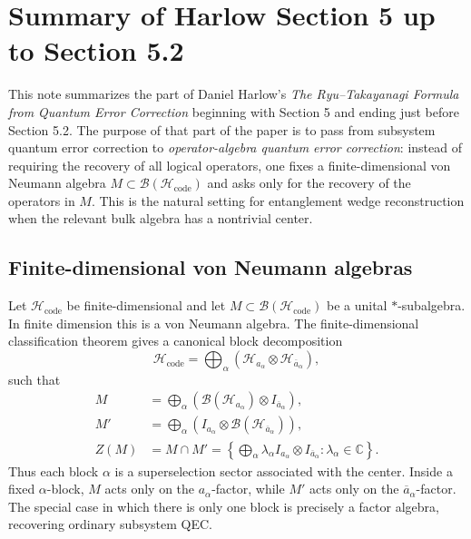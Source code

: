 \documentclass[11pt]{article}
\newcommand{\mH}{\mathcal{H}}
\newcommand{\mB}{\mathcal{B}}
\newcommand{\bara}{\overline{a}}
\newcommand{\code}{\mathrm{code}}
\begin{document}
\section*{Summary of Harlow Section 5 up to Section 5.2}

This note summarizes the part of Daniel Harlow's
\emph{The Ryu--Takayanagi Formula from Quantum Error Correction}
\cite{HarlowRTQEC} beginning with Section 5 and ending just before Section 5.2.
The purpose of that part of the paper is to pass from subsystem quantum error
correction to \emph{operator-algebra quantum error correction}: instead of
requiring the recovery of all logical operators, one fixes a finite-dimensional
von Neumann algebra \(M\subset \mB(\mH_{\code})\) and asks only for the recovery
of the operators in \(M\).  This is the natural setting for entanglement wedge
reconstruction when the relevant bulk algebra has a nontrivial center.

\subsection*{Finite-dimensional von Neumann algebras}

Let \(\mH_{\code}\) be finite-dimensional and let \(M\subset \mB(\mH_{\code})\)
be a unital \(*\)-subalgebra.  In finite dimension this is a von Neumann
algebra.  The finite-dimensional classification theorem gives a canonical block
decomposition
\begin{equation}
    \mH_{\code}
    =
    \bigoplus_{\alpha}
    \left(\mH_{a_\alpha}\otimes \mH_{\bara_\alpha}\right),
    \label{eq:code-block-decomp}
\end{equation}
such that
\begin{align}
    M
    &=
    \bigoplus_{\alpha}
    \left(\mB(\mH_{a_\alpha})\otimes I_{\bara_\alpha}\right),
    \label{eq:M-block-form}\\
    M'
    &=
    \bigoplus_{\alpha}
    \left(I_{a_\alpha}\otimes \mB(\mH_{\bara_\alpha})\right),
    \label{eq:commutant-block-form}\\
    Z(M)
    &=
    M\cap M'
    =
    \left\{
    \bigoplus_\alpha
    \lambda_\alpha I_{a_\alpha}\otimes I_{\bara_\alpha}
    :
    \lambda_\alpha\in\mathbb C
    \right\}.
    \label{eq:center-block-form}
\end{align}
Thus each block \(\alpha\) is a superselection sector associated with the
center.  Inside a fixed \(\alpha\)-block, \(M\) acts only on the
\(a_\alpha\)-factor, while \(M'\) acts only on the \(\bara_\alpha\)-factor.
The special case in which there is only one block is precisely a factor
algebra, recovering ordinary subsystem QEC.
\end{document}
